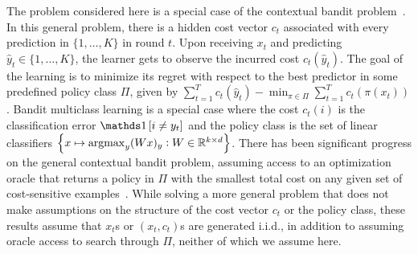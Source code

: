 
The problem considered here is a special case of the
contextual bandit problem~\citep{Auer-2003, Langford-Zhang-2008}. 
In this general problem, there is a hidden cost vector $c_t$ associated with every prediction in $\{1,\ldots,K\}$ in round $t$.  Upon receiving $x_t$ and predicting $\widehat{y}_t \in \{1,\ldots,K\}$, the learner gets to observe the incurred cost $c_t(\widehat{y}_t)$.   
The goal of the learning is to minimize its regret with respect to the best predictor in some predefined policy class $\Pi$, given by $\sum_{t=1}^T c_t(\widehat{y}_t) -
\min_{\pi \in \Pi} \sum_{t=1}^T c_t(\pi(x_t))$.
Bandit multiclass learning is a special case
where the cost $c_t(i)$ is the classification error $\indicator{i \neq y_t}$ and 
the policy class is the set of linear classifiers $\cbr{x \mapsto \argmax_y (Wx)_y: W \in \R^{k \times d}}$.
There has been significant progress on the general contextual bandit problem, 
assuming access to an optimization oracle that returns a policy in $\Pi$ with the smallest total cost on any given set of cost-sensitive examples~\citep{Dudik-Hsu-Kale-Karampatziakis-Langford-Reyzin-Zhang-2011,
Agarwal-Hsu-Kale-Langford-Li-Schapire-2014, Rakhlin-Sridharan-2016,
Syrgkanis-Krishnamurthy-Schapire-2016,
Syrgkanis-Luo-Krishnamurthy-Schapire-2016}.
While solving a more general problem that does not make assumptions on the structure of the cost vector $c_t$ or the policy class, these results assume that $x_t$s or $(x_t,c_t)$s are generated i.i.d., in addition to assuming oracle access to search through $\Pi$, neither of which we assume here.


